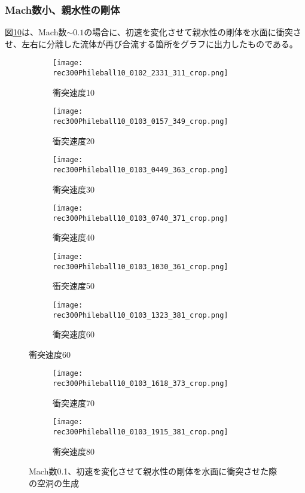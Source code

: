 \documentclass[]{jsarticle}
\begin{document}
\subsubsection{Mach数小、親水性の剛体}
\label{subsec:MSPhile}
図\ref{fig:MachSPhile}は、Mach数$\sim0.1$の場合に、初速を変化させて親水性の剛体を水面に衝突させ、左右に分離した流体が再び合流する箇所をグラフに出力したものである。
\begin{figure}[H]
  \centering
\begin{subfigure}{0.3\columnwidth}
  \centering
  \texttt{[image: rec300Phileball10\_0102\_2331\_311\_crop.png]}
  \caption{衝突速度10}
  \label{fig:MLPhilevel10}
\end{subfigure}
\begin{subfigure}{0.3\columnwidth}
  \centering
  \texttt{[image: rec300Phileball10\_0103\_0157\_349\_crop.png]}
  \caption{衝突速度20}
  \label{fig:MLPhilevel20}
\end{subfigure}
\begin{subfigure}{0.3\columnwidth}
  \centering
  \texttt{[image: rec300Phileball10\_0103\_0449\_363\_crop.png]}
  \caption{衝突速度30}
  \label{fig:MLPhilevel30}
\end{subfigure}
\begin{subfigure}{0.3\columnwidth}
  \centering
  \texttt{[image: rec300Phileball10\_0103\_0740\_371\_crop.png]}
  \caption{衝突速度40}
  \label{fig:MLPhilevel40}
\end{subfigure}
\begin{subfigure}{0.3\columnwidth}
  \centering
  \texttt{[image: rec300Phileball10\_0103\_1030\_361\_crop.png]}
  \caption{衝突速度50}
  \label{fig:MLPhilevel50}
\end{subfigure}
\begin{subfigure}{0.3\columnwidth}
  \centering
  \texttt{[image: rec300Phileball10\_0103\_1323\_381\_crop.png]}
  \caption{衝突速度60}
  \label{fig:MLPhilevel60}
\end{subfigure}
\end{figure}
\clearpage
\begin{figure}
\ContinuedFloat
  \begin{subfigure}{0.3\columnwidth}
  \centering
  \texttt{[image: rec300Phileball10\_0103\_1618\_373\_crop.png]}
  \caption{衝突速度70}
  \label{fig:MLPhilevel70}
\end{subfigure}
\begin{subfigure}{0.3\columnwidth}
  \centering
  \texttt{[image: rec300Phileball10\_0103\_1915\_381\_crop.png]}
  \caption{衝突速度80}
  \label{fig:MLPhilevel80}
\end{subfigure}
\caption{Mach数0.1、初速を変化させて親水性の剛体を水面に衝突させた際の空洞の生成}
\label{fig:MachSPhile}
\end{figure}
\end{document}
